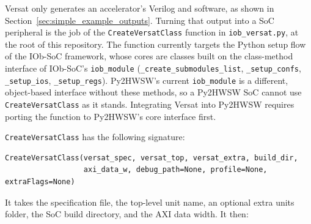 %

Versat only generates an accelerator's Verilog and software, as shown in Section~\ref{sec:simple_example_outputs}. Turning that output into a SoC peripheral is the job of the \texttt{CreateVersatClass} function in \texttt{iob\_versat.py}, at the root of this repository. The function currently targets the Python setup flow of the IOb-SoC framework, whose cores are classes built on the class-method interface of IOb-SoC's \texttt{iob\_module} (\texttt{\_create\_submodules\_list}, \texttt{\_setup\_confs}, \texttt{\_setup\_ios}, \texttt{\_setup\_regs}). Py2HWSW's current \texttt{iob\_module} is a different, object-based interface without these methods, so a Py2HWSW SoC cannot use \texttt{CreateVersatClass} as it stands. Integrating Versat into Py2HWSW requires porting the function to Py2HWSW's core interface first.

\texttt{CreateVersatClass} has the following signature:

\begin{lstlisting}[caption={iob\_versat.py}]
CreateVersatClass(versat_spec, versat_top, versat_extra, build_dir,
                  axi_data_w, debug_path=None, profile=None, extraFlags=None)
\end{lstlisting}

It takes the specification file, the top-level unit name, an optional extra units folder, the SoC build directory, and the AXI data width. It then:

